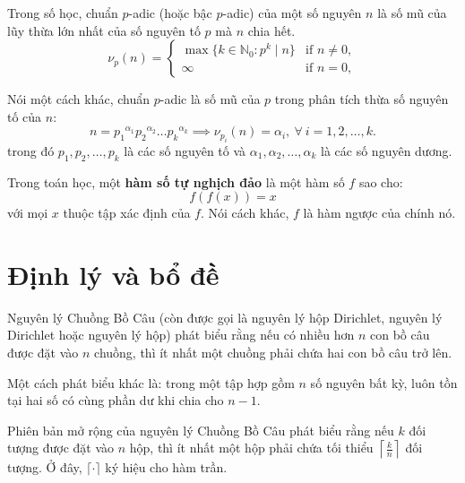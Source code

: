 \documentclass[../imo-training-open-book.tex]{subfiles}
\begin{document}
\begin{definition*} 
    \label{theorem:p-adic-valuation}
    Trong số học, chuẩn \( p \)-adic (hoặc bậc \( p \)-adic) của một số nguyên \( n \) là số mũ của lũy thừa lớn nhất của số nguyên tố \( p \) mà \( n \) chia hết.
    \[
        \nu_p(n) = 
        \begin{cases}
            \max \{ k \in \mathbb{N}_0 : p^k \mid n \} & \text{if } n \neq 0, \\
            \infty & \text{if } n = 0,
        \end{cases}
    \]

    Nói một cách khác, chuẩn \( p \)-adic là số mũ của \( p \) trong phân tích thừa số nguyên tố của \( n \):
    \[
        n={p_{1}}^{\alpha _{1}}{p_{2}}^{\alpha _{2}}{\dots }{p_{k}}^{\alpha _{k}} \implies \nu_{p_i}(n) = \alpha_i,\ \forall\ i=1,2,\ldots,k.
    \]
    trong đó $p_{1},p_{2},\ldots,p_{k}$ là các số nguyên tố và $\alpha _{1},\alpha _{2},\dots ,\alpha _{k}$ là các số nguyên dương.
\end{definition*}

\begin{definition*}
    \label{definition:involution-function}
    Trong toán học, một \textbf{hàm số tự nghịch đảo} là một hàm số \( f \) sao cho:
    \[
        f(f(x)) = x
    \]
    với mọi \( x \) thuộc tập xác định của \( f \).  
    Nói cách khác, \( f \) là hàm ngược của chính nó.
\end{definition*}

\newpage

\chapter{Định lý và bổ đề}

\begin{theorem*}
    \label{theorem:pigeonhole-principle}
    Nguyên lý Chuồng Bồ Câu (còn được gọi là nguyên lý hộp Dirichlet, nguyên lý Dirichlet hoặc nguyên lý hộp)
    phát biểu rằng nếu có nhiều hơn \( n \) con bồ câu được đặt vào \( n \) chuồng, thì ít nhất một chuồng phải chứa hai con bồ câu trở lên.
    
    Một cách phát biểu khác là: trong một tập hợp gồm \( n \) số nguyên bất kỳ, luôn tồn tại hai số có cùng phần dư khi chia cho \( n-1 \).

    Phiên bản mở rộng của nguyên lý Chuồng Bồ Câu phát biểu rằng nếu \( k \) đối tượng được đặt vào \( n \) hộp,
    thì ít nhất một hộp phải chứa tối thiểu \( \left\lceil \frac{k}{n} \right\rceil \) đối tượng.
    Ở đây, \( \lceil \cdot \rceil \) ký hiệu cho hàm trần.
\end{theorem*}
\end{document}

